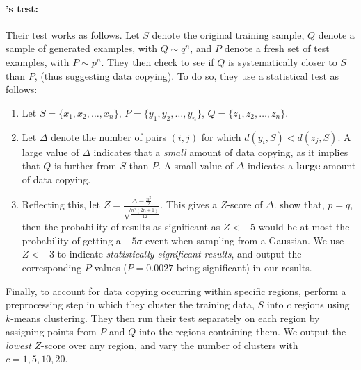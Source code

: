 \paragraph{\cite{MCD2020}'s test:} Their test works as follows. Let $S$ denote the original training sample, $Q$ denote a sample of generated examples, with $Q \sim q^{n}$, and $P$ denote a fresh set of test examples, with $P \sim p^n$. They then check to see if $Q$ is systematically closer to $S$ than $P$, (thus suggesting data copying). To do so, they use a statistical test as follows:
\begin{enumerate}
	\item Let $S = \{x_1, x_2, \dots, x_n\}$, $P = \{y_1, y_2, \dots, y_n\}$, $Q = \{z_1, z_2, \dots, z_n\}$. 
	\item Let $\Delta$ denote the number of pairs $(i, j)$ for which $d(y_i, S) < d(z_j, S)$. A large value of $\Delta$ indicates that a \textit{small} amount of data copying, as it implies that $Q$ is further from $S$ than $P$. A small value of $\Delta$ indicates a \textbf{large} amount of data copying.
	\item Reflecting this, let $Z = \frac{\Delta - \frac{n^2}{2}}{\sqrt{\frac{n^2(2n+1)}{12}}}$. This gives a $Z$-score of $\Delta$. \cite{MCD2020} show that, $p = q$, then the probability of results as significant as $Z < -5$ would be at most the probability of getting a $-5\sigma$ event when sampling from a Gaussian. We use $Z < -3$ to indicate \textit{statistically significant results}, and output the corresponding $P$-values ($P =  0.0027$ being significant) in our results. 
\end{enumerate}

Finally, to account for data copying occurring within specific regions, \cite{MCD2020} perform a preprocessing step in which they cluster the training data, $S$ into $c$ regions using $k$-means clustering. They then run their test separately on each region by assigning points from $P$ and $Q$ into the regions containing them. We output the \textit{lowest} $Z$-score over any region, and vary the number of clusters with $c= 1, 5, 10, 20$. 

